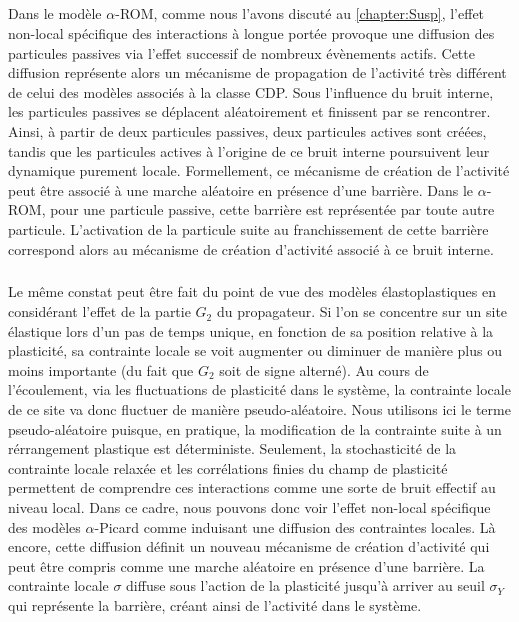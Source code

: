 \subparagraph{}Dans le modèle $\alpha$-ROM, comme nous l'avons discuté au \autoref{chapter:Susp}, l'effet non-local spécifique des interactions à longue portée provoque une diffusion des particules passives via l'effet successif de nombreux évènements actifs. Cette diffusion représente alors un mécanisme de propagation de l'activité très différent de celui des modèles associés à la classe CDP. Sous l’influence du bruit interne, les particules passives se déplacent aléatoirement et finissent par se rencontrer. Ainsi, à partir de deux particules passives, deux particules actives sont créées, tandis que les particules actives à l'origine de ce bruit interne poursuivent leur dynamique purement locale. Formellement, ce mécanisme de création de l'activité peut être associé à une marche aléatoire en présence d'une barrière. Dans le $\alpha$-ROM, pour une particule passive, cette barrière est représentée par toute autre particule. L'activation de la particule suite au franchissement de cette barrière correspond alors au mécanisme de création d'activité associé à ce bruit interne.

\subparagraph{}Le même constat peut être fait du point de vue des modèles élastoplastiques en considérant l'effet de la partie $G_2$ du propagateur. Si l'on se concentre sur un site élastique lors d'un pas de temps unique, en fonction de sa position relative à la plasticité, sa contrainte locale se voit augmenter ou diminuer de manière plus ou moins importante (du fait que $G_2$ soit de signe alterné). Au cours de l'écoulement, via les fluctuations de plasticité dans le système, la contrainte locale de ce site va donc fluctuer de manière pseudo-aléatoire. Nous utilisons ici le terme pseudo-aléatoire puisque, en pratique, la modification de la contrainte suite à un rérrangement plastique est déterministe. Seulement, la stochasticité de la contrainte locale relaxée et les corrélations finies du champ de plasticité permettent de comprendre ces interactions comme une sorte de bruit effectif au niveau local. Dans ce cadre, nous pouvons donc voir l'effet non-local spécifique des modèles $\alpha$-Picard comme induisant une diffusion des contraintes locales. Là encore, cette diffusion définit un nouveau mécanisme de création d'activité qui peut être compris comme une marche aléatoire en présence d'une barrière. La contrainte locale $\sigma$ diffuse sous l'action de la plasticité jusqu'à arriver au seuil $\sigma_Y$ qui représente la barrière, créant ainsi de l'activité dans le système. 

